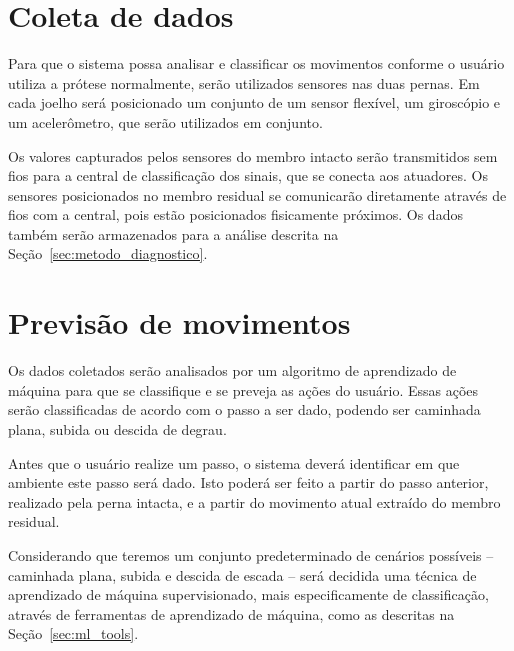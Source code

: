 \section{Coleta de dados}\label{sec:metodo_coleta}
Para que o sistema possa analisar e classificar os movimentos conforme o usuário utiliza a prótese normalmente, serão utilizados sensores nas duas pernas. Em cada joelho será posicionado um conjunto de um sensor flexível, um giroscópio e um acelerômetro, que serão utilizados em conjunto.

Os valores capturados pelos sensores do membro intacto serão transmitidos sem fios para a central de classificação dos sinais, que se conecta aos atuadores. Os sensores posicionados no membro residual se comunicarão diretamente através de fios com a central, pois estão posicionados fisicamente próximos. Os dados também serão armazenados para a análise descrita na Seção~\ref{sec:metodo_diagnostico}.

\section{Previsão de movimentos}\label{sec:metodo_previsao}
Os dados coletados serão analisados por um algoritmo de aprendizado de máquina para que se classifique e se preveja as ações do usuário. Essas ações serão classificadas de acordo com o passo a ser dado, podendo ser caminhada plana, subida ou descida de degrau.

Antes que o usuário realize um passo, o sistema deverá identificar em que ambiente este passo será dado. Isto poderá ser feito a partir do passo anterior, realizado pela perna intacta, e a partir do movimento atual extraído do membro residual.

Considerando que teremos um conjunto predeterminado de cenários possíveis -- caminhada plana, subida e descida de escada -- será decidida uma técnica de aprendizado de máquina supervisionado, mais especificamente de classificação, através de ferramentas de aprendizado de máquina, como as descritas na Seção~\ref{sec:ml_tools}.

